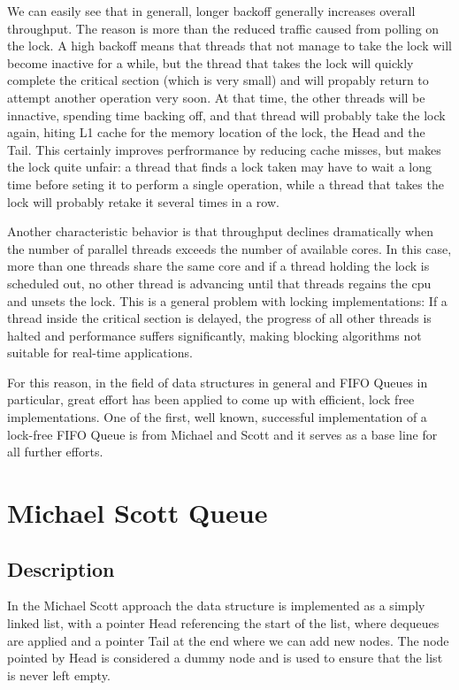 We can easily see that in generall, longer backoff generally increases overall throughput. The reason is more than the reduced traffic caused from polling on the lock. A high backoff means that threads that not manage to take the lock will become inactive for a while, but the thread that takes the lock will quickly complete the critical section (which is very small) and will propably return to attempt another operation very soon. At that time, the other threads will be innactive, spending time backing off, and that thread will probably take the lock again, hiting L1 cache for the memory location of the lock, the Head and the Tail. This certainly improves perfrormance by reducing cache misses, but makes the lock quite unfair: a thread that finds a lock taken may have to wait a long time before seting it to perform a single operation, while a thread that takes the lock will probably retake it several times in a row.   

Another characteristic behavior is that throughput declines dramatically when the number of parallel threads exceeds the number of available cores. In this case, more than one threads share the same core and if a thread holding the lock is scheduled out, no other thread is advancing until that threads regains the cpu and unsets the lock. This is a general problem with locking implementations: If a thread inside the critical section is delayed, the progress of all other threads is halted and performance suffers significantly, making blocking algorithms not suitable for real-time applications.


For this reason, in the field of data structures in general and FIFO Queues in particular, great effort has been applied to come up with efficient, lock free implementations. One of the first, well known, successful implementation of a lock-free FIFO Queue is from Michael and Scott \cite{msqueue} and it serves as a base line for all further efforts.

\section{Michael Scott Queue}
\subsection{Description}

In the Michael Scott approach the data structure is implemented as a simply linked list, with a pointer Head referencing the start of the list, where dequeues are applied and a pointer Tail at the end where we can add new nodes. The node pointed by Head is considered a dummy node  and is used to ensure that the list is never left empty.

